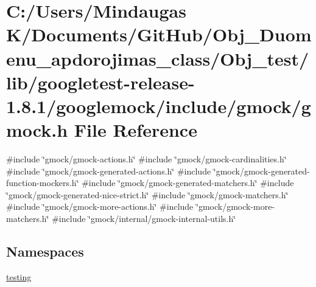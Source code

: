 \hypertarget{_obj__test_2lib_2googletest-release-1_88_81_2googlemock_2include_2gmock_2gmock_8h}{}\section{C\+:/\+Users/\+Mindaugas K/\+Documents/\+Git\+Hub/\+Obj\+\_\+\+Duomenu\+\_\+apdorojimas\+\_\+class/\+Obj\+\_\+test/lib/googletest-\/release-\/1.8.1/googlemock/include/gmock/gmock.h File Reference}
\label{_obj__test_2lib_2googletest-release-1_88_81_2googlemock_2include_2gmock_2gmock_8h}
{\ttfamily \#include \char`\"{}gmock/gmock-\/actions.\+h\char`\"{}}\newline
{\ttfamily \#include \char`\"{}gmock/gmock-\/cardinalities.\+h\char`\"{}}\newline
{\ttfamily \#include \char`\"{}gmock/gmock-\/generated-\/actions.\+h\char`\"{}}\newline
{\ttfamily \#include \char`\"{}gmock/gmock-\/generated-\/function-\/mockers.\+h\char`\"{}}\newline
{\ttfamily \#include \char`\"{}gmock/gmock-\/generated-\/matchers.\+h\char`\"{}}\newline
{\ttfamily \#include \char`\"{}gmock/gmock-\/generated-\/nice-\/strict.\+h\char`\"{}}\newline
{\ttfamily \#include \char`\"{}gmock/gmock-\/matchers.\+h\char`\"{}}\newline
{\ttfamily \#include \char`\"{}gmock/gmock-\/more-\/actions.\+h\char`\"{}}\newline
{\ttfamily \#include \char`\"{}gmock/gmock-\/more-\/matchers.\+h\char`\"{}}\newline
{\ttfamily \#include \char`\"{}gmock/internal/gmock-\/internal-\/utils.\+h\char`\"{}}\newline
\subsection*{Namespaces}
\begin{DoxyCompactItemize}
\item 
 \mbox{\hyperlink{namespacetesting}{testing}}
\end{DoxyCompactItemize}
